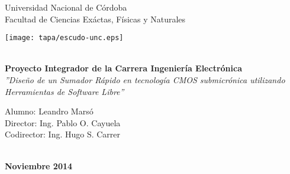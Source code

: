 \begin{titlepage}
\pagestyle{empty}       

\begin{center}
	\Huge{Universidad Nacional de Córdoba\\}
	\Large {Facultad de Ciencias Exáctas, Físicas y Naturales}\\

\vspace{1cm}

\texttt{[image: tapa/escudo-unc.eps]}

\vspace{0.1cm}

	\Huge \textbf{\\[2ex]Proyecto Integrador de la Carrera Ingeniería Electrónica}
	\Large \textsl{\\[2ex] ''Diseño de un Sumador Rápido en tecnología CMOS submicrónica utilizando Herramientas de Software Libre''}

\vspace{1cm}
	\begin{normalsize} 
	Alumno: Leandro Marsó \\
	Director: Ing. Pablo O. Cayuela \\
	Codirector: Ing. Hugo S. Carrer
	\end{normalsize}
	\begin{large}	
	\vspace{0.5cm}
	\\ \textbf{Noviembre 2014}
	\end{large}

\end{center}

\vspace{0.5cm}

\begin{center}

\end{center}

\hfuzz=50pt
\end{titlepage}
